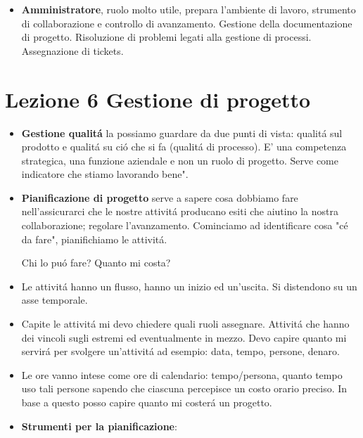 \documentclass[10pt]{article}
\begin{document}
\begin{itemize}
\begin{itemize}
\begin{itemize}
	\item \textbf{Amministratore}, ruolo molto utile, prepara l'ambiente di 
	lavoro, strumento di collaborazione e controllo di avanzamento. Gestione 
	della documentazione di progetto. 
	Risoluzione di problemi legati alla gestione di processi. Assegnazione di 
	tickets.
	\end{itemize}

\end{itemize}

\section{Lezione 6 Gestione di progetto}
\begin{itemize}

\item \textbf{Gestione qualit\'a} la possiamo guardare da due punti di vista: 
qualit\'a sul prodotto e qualit\'a su ci\'o che si fa (qualit\'a di processo). 
E' una competenza strategica, una funzione aziendale e non un ruolo di progetto.
Serve come indicatore che stiamo lavorando bene". 


\item \textbf{Pianificazione di progetto} serve a sapere cosa dobbiamo fare 
nell'assicurarci che le nostre attivit\'a producano esiti che aiutino la nostra 
collaborazione; regolare l'avanzamento. 
Cominciamo ad identificare cosa "c\'e da fare", pianifichiamo le attivit\'a.

Chi lo pu\'o fare? 
Quanto mi costa? 

\item Le attivit\'a hanno un 
flusso, hanno un inizio ed un'uscita. Si 
distendono su un asse temporale.

\item Capite le attivit\'a mi devo chiedere quali ruoli assegnare. Attivit\'a 
che hanno dei vincoli sugli estremi ed eventualmente in mezzo. Devo capire 
quanto mi servir\'a per svolgere un'attivit\'a ad esempio: data,
tempo, persone, denaro.

\item Le ore vanno intese come ore di calendario: 
tempo/persona, quanto tempo uso tali persone sapendo che ciascuna percepisce un 
costo orario preciso. In base a questo posso capire quanto mi coster\'a un 
progetto.

\item \textbf{Strumenti per la pianificazione}:
\begin{itemize}


\end{itemize}
\end{itemize}
\end{itemize}
\end{document}
